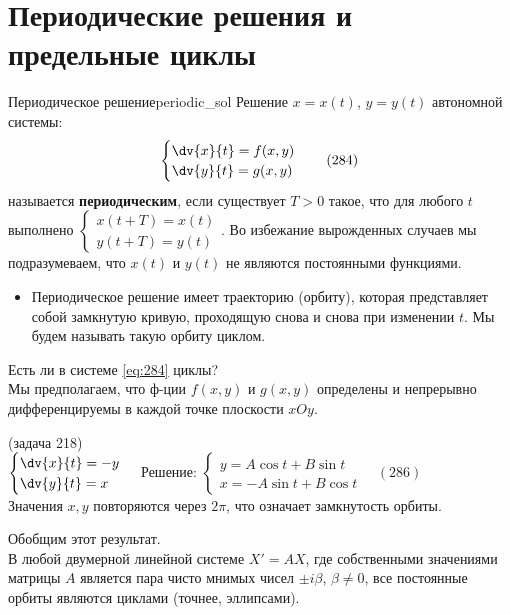 \section{Периодические решения и предельные циклы}
\begin{definition}{Периодическое решение}{periodic_sol}
	Решение $x=x(t)$, $y=y(t)$ автономной системы:
	\begin{equation} \label{eq:284}
		\begin{cases}
			\dv{x}{t} = f(x,y) \\
			\dv{y}{t} = g(x,y)
		\end{cases} \quad (284)
	\end{equation}
	называется \textbf{периодическим}, если существует $T > 0$ такое, что для любого $t$ выполнено $\begin{cases} x(t+T) = x(t) \\ y(t+T) = y(t) \end{cases}$. Во избежание вырожденных случаев мы подразумеваем, что $x(t)$ и $y(t)$ не являются постоянными функциями.
\end{definition}

\begin{itemize}
	\item Периодическое решение имеет траекторию (орбиту), которая представляет собой замкнутую кривую, проходящую снова и снова при изменении $t$. Мы будем называть такую орбиту циклом.
\end{itemize}

Есть ли в системе \eqref{eq:284} циклы? \\
Мы предполагаем, что ф-ции $f(x,y)$ и $g(x,y)$ определены и непрерывно дифференцируемы в каждой точке плоскости $xOy$.

\begin{example}
	(задача 218) \\
	$\begin{cases} \dv{x}{t} = -y \\ \dv{y}{t} = x \end{cases}$ \qquad Решение: $\begin{cases} y = A\cos t + B\sin t \\ x = -A\sin t + B\cos t \end{cases} \quad (286)$ \\
	Значения $x,y$ повторяются через $2\pi$, что означает замкнутость орбиты.
\end{example}

Обобщим этот результат. \\
В любой двумерной линейной системе $X' = AX$, где собственными значениями матрицы $A$ является пара чисто мнимых чисел $\pm i\beta$, $\beta \neq 0$, все постоянные орбиты являются циклами (точнее, эллипсами).

